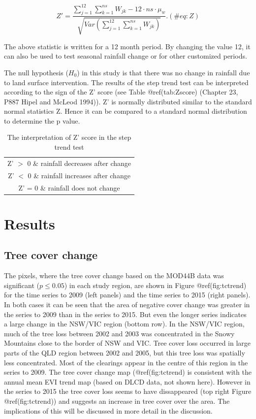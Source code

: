 \documentclass[fleqn,10pt,lineno]{wlpeerj} %
\begin{document}
\begin{equation}
  Z'=\frac{\sum_{j=1}^{12}\sum_{k=1}^{ns}W_{jk}-12\cdot ns\cdot\mu_w}{\sqrt{Var(\sum_{j=1}^{12}\sum_{k=1}^{ns}W_{jk})}}.
  (\#eq:Z)
\end{equation}

The above statistic is written for a 12 month period. By changing the
value 12, it can also be used to test seasonal rainfall change or for
other customized periods.

The null hypothesis (\(H_0\)) in this study is that there was no change
in rainfall due to land surface intervention. The results of the step
trend test can be interpreted according to the sign of the Z' score (see
Table @ref(tab:Zscore) (Chapter 23, P887 Hipel and McLeod 1994)). Z' is
normally distributed similar to the standard normal statistics Z. Hence
it can be compared to a standard normal distribution to determine the p
value.

\begin{longtable}[]{@{}c@{}}
\caption{The interpretation of Z' score in the step trend
test}\tabularnewline
\toprule
Z' \(>\) 0 \& rainfall decreases after change\tabularnewline
Z' \(<\) 0 \& rainfall increases after change\tabularnewline
Z' = 0 \& rainfall does not change\tabularnewline
\bottomrule
\end{longtable}

\section{Results}\label{results}

\subsection{Tree cover change}\label{tree-cover-change}

The pixels, where the tree cover change based on the MOD44B data was
significant (\(p \leq 0.05\)) in each study region, are shown in Figure
@ref(fig:tctrend) for the time series to 2009 (left panels) and the time
series to 2015 (right panels). In both cases it can be seen that the
area of negative cover change was greater in the series to 2009 than in
the series to 2015. But even the longer series indicates a large change
in the NSW/VIC region (bottom row). In the NSW/VIC region, much of the
tree loss between 2002 and 2003 was concentrated in the Snowy Mountains
close to the border of NSW and VIC. Tree cover loss occurred in large
parts of the QLD region between 2002 and 2005, but this tree loss was
spatially less concentrated. Most of the clearings appear in the centre
of this region in the series to 2009. The tree cover change map
(@ref(fig:tctrend) is consistent with the annual mean EVI trend map
(based on DLCD data, not shown here). However in the series to 2015 the
tree cover loss seems to have dissappeared (top right Figure
@ref(fig:tctrend)) and suggests an increase in tree cover over the area.
The implications of this will be discussed in more detail in the
discussion.
\end{document}
